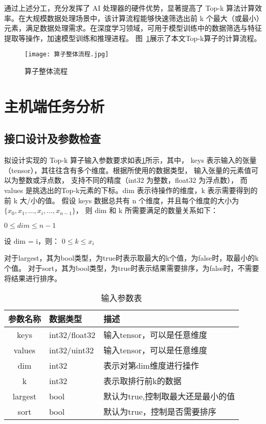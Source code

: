 通过上述分工，充分发挥了 AI 处理器的硬件优势，显著提高了 Top-k 算法计算效率。在大规模数据处理场景中，该计算流程能够快速筛选出前 k 个最大（或最小）元素，满足数据处理需求。在深度学习领域，可用于模型训练中的数据筛选与特征提取等操作，加速模型训练和推理进程。
图~\ref{fig:topk}展示了本文Top-k算子的计算流程。
\begin{figure}[ht]
    \centering
    \texttt{[image: 算子整体流程.jpg]}
    \caption{算子整体流程}
    \label{fig:topk}
\end{figure}




\section{主机端任务分析}
    \subsection{接口设计及参数检查}
    拟设计实现的 Top-k 算子输入参数要求如表\ref{tab:input_tab}所示，其中，
    keys 表示输入的张量（tensor），其往往含有多个维度。根据所使用的数据类型，
    输入张量的元素值可以为整数或浮点数，
    支持不同的精度（int32 为整数，float32 为浮点数），
    而 values 是挑选出的Top-k元素的下标。dim 表示待操作的维度，k 表示需要得到的前 k 大/小的值。
    假设 keys 数据总共有 n 个维度，并且每个维度的大小为 $\{ x_{0}, x_{1}, \dots, x_{i}, \dots, x_{n-1} \}$，
    则 dim 和 k 所需要满足的数量关系如下：

    \begin{center}
        $0 \leq dim \leq n - 1$
        
        设 dim = i，则： $0 \leq k \leq x_{i}$
    \end{center}
    对于largest，其为bool类型，为true时表示取最大的k个值，为false时，取最小的k个值。
    对于sort，其为bool类型，为true时表示结果需要排序，为false时，不需要将结果进行排序。
    \begin{table}
        \centering
        \caption{输入参数表}
        \label{tab:input_tab}
        \begin{tabular}{cll} %
          \toprule
          参数名称   & 数据类型                                       & 描述                          \\
          \midrule
          keys & int32/float32 & 输入tensor，可以是任意维度                      \\
          values & int32/uint32 & 输入tensor，可以是任意维度                      \\
          dim & int32   & 表示对第dim维度进行操作            \\
          k   & int32   & 表示取排行前k的数据              \\
          largest & bool   & 默认为true,控制取最大还是最小的值            \\
          sort & bool   & 默认为true，控制是否需要排序            \\
          
          \bottomrule
        \end{tabular}
    \end{table}


